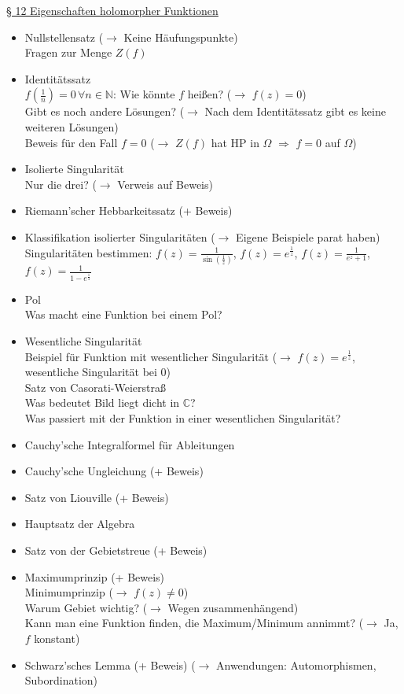 \documentclass[11pt]{article}
\newcommand{\C}{\mathbb{C}}
\newcommand{\N}{\mathbb{N}}
\begin{document}
\underline{§ 12 Eigenschaften holomorpher Funktionen}
\vspace{-0.5cm}
\begin{itemize}
\item Nullstellensatz ($\rightarrow$ Keine Häufungspunkte)\\
\quad Fragen zur Menge $Z(f)$
\item Identitätssatz \\
\quad $f(\frac{1}{n}) = 0 \, \forall n \in \N$: Wie könnte $f$ heißen? ($\rightarrow$ $f(z) = 0$) \\
\quad Gibt es noch andere Lösungen? ($\rightarrow$ Nach dem Identitätssatz gibt es keine weiteren Lösungen) \\
\quad Beweis für den Fall $f=0$ ($\rightarrow$ $Z(f)$ hat HP in $\Omega$ $\Rightarrow$ $f = 0$ auf $\Omega$)
\item Isolierte Singularität \\
\quad Nur die drei? ($\rightarrow$ Verweis auf Beweis)
\item Riemann'scher Hebbarkeitssatz (+ Beweis)
\item Klassifikation isolierter Singularitäten ($\rightarrow$ Eigene Beispiele parat haben) \\
\quad Singularitäten bestimmen: $f(z) = \frac{1}{\sin(\frac{1}{z})}$, $f(z) = e^{\frac{1}{z}}$, $f(z) = \frac{1}{e^z + 1}$, $f(z) = \frac{1}{1-e^{\frac{1}{z}}}$ 
\item Pol \\
\quad Was macht eine Funktion bei einem Pol?
\item Wesentliche Singularität \\
\quad Beispiel für Funktion mit wesentlicher Singularität ($\rightarrow$ $f(z) = e^{\frac{1}{z}}$, wesentliche Singularität bei $0$)\\
\quad Satz von Casorati-Weierstraß \\
\quad Was bedeutet \glqq Bild liegt dicht in $\C$\grqq{}? \\
\quad Was passiert mit der Funktion in einer wesentlichen Singularität?
\item Cauchy'sche Integralformel für Ableitungen
\item Cauchy'sche Ungleichung (+ Beweis)
\item Satz von Liouville (+ Beweis)
\item Hauptsatz der Algebra
\item Satz von der Gebietstreue (+ Beweis)
\item Maximumprinzip (+ Beweis) \\
\quad Minimumprinzip ($\rightarrow$ $f(z) \neq 0$) \\
\quad Warum Gebiet wichtig? ($\rightarrow$ Wegen zusammenhängend) \\
\quad Kann man eine Funktion finden, die Maximum/Minimum annimmt? ($\rightarrow$ Ja, $f$ konstant)
\item Schwarz'sches Lemma (+ Beweis) ($\rightarrow$ Anwendungen: Automorphismen, Subordination)
\end{itemize}
\end{document}
